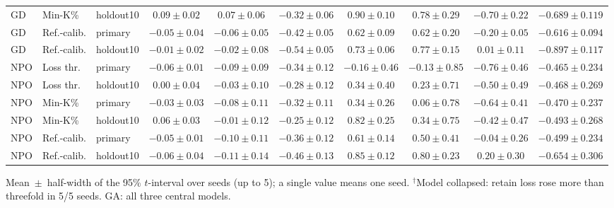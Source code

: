 \begin{table}[t]
\begin{tabular*}{\textwidth}{@{\extracolsep{\fill}}lllccccccc@{}}
GD & Min-K\% & holdout10 & $0.09 \pm 0.02$ & $0.07 \pm 0.06$ & $-0.32 \pm 0.06$ & $0.90 \pm 0.10$ & $0.78 \pm 0.29$ & $-0.70 \pm 0.22$ & $-0.689 \pm 0.119$ \\
GD & Ref.-calib. & primary & $-0.05 \pm 0.04$ & $-0.06 \pm 0.05$ & $-0.42 \pm 0.05$ & $0.62 \pm 0.09$ & $0.62 \pm 0.20$ & $-0.20 \pm 0.05$ & $-0.616 \pm 0.094$ \\
GD & Ref.-calib. & holdout10 & $-0.01 \pm 0.02$ & $-0.02 \pm 0.08$ & $-0.54 \pm 0.05$ & $0.73 \pm 0.06$ & $0.77 \pm 0.15$ & $0.01 \pm 0.11$ & $-0.897 \pm 0.117$ \\
NPO & Loss thr. & primary & $-0.06 \pm 0.01$ & $-0.09 \pm 0.09$ & $-0.34 \pm 0.12$ & $-0.16 \pm 0.46$ & $-0.13 \pm 0.85$ & $-0.76 \pm 0.46$ & $-0.465 \pm 0.234$ \\
NPO & Loss thr. & holdout10 & $0.00 \pm 0.04$ & $-0.03 \pm 0.10$ & $-0.28 \pm 0.12$ & $0.34 \pm 0.40$ & $0.23 \pm 0.71$ & $-0.50 \pm 0.49$ & $-0.468 \pm 0.269$ \\
NPO & Min-K\% & primary & $-0.03 \pm 0.03$ & $-0.08 \pm 0.11$ & $-0.32 \pm 0.11$ & $0.34 \pm 0.26$ & $0.06 \pm 0.78$ & $-0.64 \pm 0.41$ & $-0.470 \pm 0.237$ \\
NPO & Min-K\% & holdout10 & $0.06 \pm 0.03$ & $-0.01 \pm 0.12$ & $-0.25 \pm 0.12$ & $0.82 \pm 0.25$ & $0.34 \pm 0.75$ & $-0.42 \pm 0.47$ & $-0.493 \pm 0.268$ \\
NPO & Ref.-calib. & primary & $-0.05 \pm 0.01$ & $-0.10 \pm 0.11$ & $-0.36 \pm 0.12$ & $0.61 \pm 0.14$ & $0.50 \pm 0.41$ & $-0.04 \pm 0.26$ & $-0.499 \pm 0.234$ \\
NPO & Ref.-calib. & holdout10 & $-0.06 \pm 0.04$ & $-0.11 \pm 0.14$ & $-0.46 \pm 0.13$ & $0.85 \pm 0.12$ & $0.80 \pm 0.23$ & $0.20 \pm 0.30$ & $-0.654 \pm 0.306$ \\
\bottomrule
\end{tabular*}

\smallskip
{\footnotesize Mean~$\pm$~half-width of the 95\% $t$-interval over seeds (up to 5); a single value means one seed. $^{\dagger}$Model collapsed: retain loss rose more than threefold in 5/5 seeds. GA: all three central models.\par}
\end{table}
